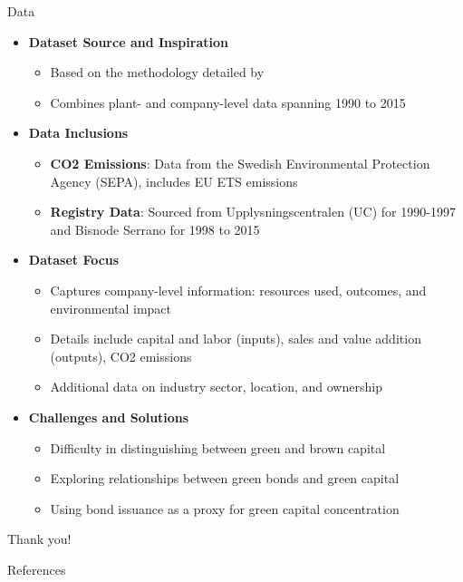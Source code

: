 \documentclass[aspectratio=169]{beamer}
\begin{document}
\begin{frame}{Data}\footnotesize
	\begin{itemize}
		\item \textbf{Dataset Source and Inspiration}
			\begin{itemize}
				\item Based on the methodology detailed by \cite{martinsson2024effect}
				\item Combines plant- and company-level data spanning 1990 to 2015
			\end{itemize}
	  	\item \textbf{Data Inclusions}
			\begin{itemize}
				\item \textbf{CO2 Emissions}: Data from the Swedish Environmental Protection Agency (SEPA), includes EU ETS emissions
				\item \textbf{Registry Data}: Sourced from Upplysningscentralen (UC) for 1990-1997 and Bisnode Serrano for 1998 to 2015
			\end{itemize}
		\item \textbf{Dataset Focus}
		\begin{itemize}
			\item Captures company-level information: resources used, outcomes, and environmental impact
			\item Details include capital and labor (inputs), sales and value addition (outputs), CO2 emissions
			\item Additional data on industry sector, location, and ownership
		\end{itemize}
	\item \textbf{Challenges and Solutions}
		\begin{itemize}
			\item Difficulty in distinguishing between green and brown capital
			\item Exploring relationships between green bonds and green capital
			\item Using bond issuance as a proxy for green capital concentration
		\end{itemize}
	\end{itemize}
	\end{frame}

\begin{frame}[noframenumbering]
	\begin{center}
		\Huge
		Thank you!
	\end{center}
\end{frame}

\appendix
\footnotesize
	\begin{frame}[allowframebreaks]{References}
			

		
	\end{frame}
	
	\normalsize
\end{document}
